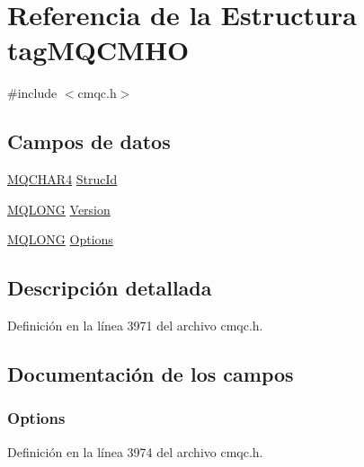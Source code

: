\hypertarget{structtag_m_q_c_m_h_o}{}\section{Referencia de la Estructura tag\+M\+Q\+C\+M\+H\+O}
\label{structtag_m_q_c_m_h_o}


{\ttfamily \#include $<$cmqc.\+h$>$}

\subsection*{Campos de datos}
\begin{DoxyCompactItemize}
\item 
\hyperlink{cmqc_8h_a12590e546ed66fda7cf21c1d5cefa31d}{M\+Q\+C\+H\+A\+R4} \hyperlink{structtag_m_q_c_m_h_o_a0530922ca944569b52601d74941f96e4}{Struc\+Id}
\item 
\hyperlink{cmqc_8h_a1fb8d28cbda3fa8766a9821230cdb6d5}{M\+Q\+L\+O\+N\+G} \hyperlink{structtag_m_q_c_m_h_o_a0656ef8f766b3907d394d88a35d7b7e9}{Version}
\item 
\hyperlink{cmqc_8h_a1fb8d28cbda3fa8766a9821230cdb6d5}{M\+Q\+L\+O\+N\+G} \hyperlink{structtag_m_q_c_m_h_o_ad7aff2d6c6044809464380998d24ec5c}{Options}
\end{DoxyCompactItemize}


\subsection{Descripción detallada}


Definición en la línea 3971 del archivo cmqc.\+h.



\subsection{Documentación de los campos}
\hypertarget{structtag_m_q_c_m_h_o_ad7aff2d6c6044809464380998d24ec5c}{}
\subsubsection[{Options}]{ Options}\label{structtag_m_q_c_m_h_o_ad7aff2d6c6044809464380998d24ec5c}


Definición en la línea 3974 del archivo cmqc.\+h.

